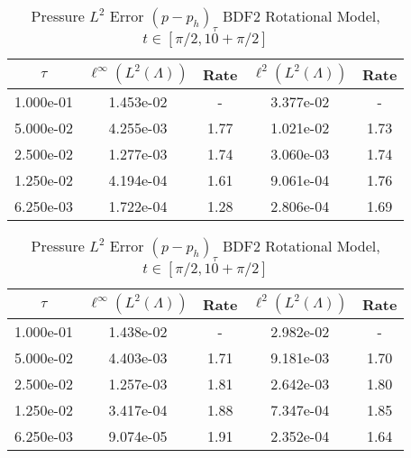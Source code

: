 \documentclass[letterpaper]{erdc}
\begin{document}
\begin{table}[h!]
  \parbox{.45\linewidth}{
  \tiny
  \centering
    \caption{Density $L^2$ Error $(\rho - \rho_h)_{\tau}$ BDF2 Rotational Model, $t\in[\pi/2, 10+\pi/2]$}
    \begin{tabular}{c|c|c|c|c}
      $\tau$  & $\ell^{\infty}\left(L^2(\Lambda)\right)$ &  Rate  &  $\ell^2\left(L^2(\Lambda)\right)$  &  Rate\\
      \hline
      1.000e-01 & 1.453e-02 &  -   & 3.377e-02 &  -  \\
      5.000e-02 & 4.255e-03 & 1.77 & 1.021e-02 & 1.73\\
      2.500e-02 & 1.277e-03 & 1.74 & 3.060e-03 & 1.74\\
      1.250e-02 & 4.194e-04 & 1.61 & 9.061e-04 & 1.76\\
      6.250e-03 & 1.722e-04 & 1.28 & 2.806e-04 & 1.69
    \end{tabular}
    }
    \hfill
    \parbox{.45\linewidth}{
      \tiny
      \centering
        \caption{Pressure $L^2$ Error $(p - p_h)_{\tau}$ BDF2 Rotational Model, $t\in[\pi/2, 10+\pi/2]$}
        \begin{tabular}{c|c|c|c|c}
          $\tau$ &  $\ell^{\infty}\left(L^2(\Lambda)\right)$ &  Rate  &  $\ell^2\left(L^2(\Lambda)\right)$  &  Rate\\
          \hline
          1.000e-01 & 1.438e-02 &  -   & 2.982e-02 &  -  \\
          5.000e-02 & 4.403e-03 & 1.71 & 9.181e-03 & 1.70\\
          2.500e-02 & 1.257e-03 & 1.81 & 2.642e-03 & 1.80\\
          1.250e-02 & 3.417e-04 & 1.88 & 7.347e-04 & 1.85\\
          6.250e-03 & 9.074e-05 & 1.91 & 2.352e-04 & 1.64
        \end{tabular}
    }
\end{table}
\end{document}
